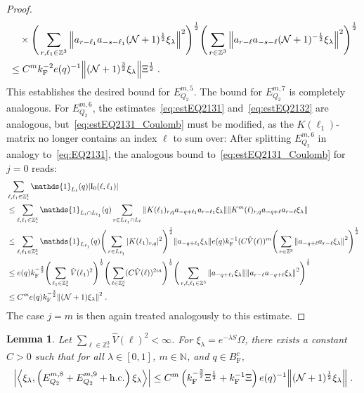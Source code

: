 \documentclass[12pt,a4paper]{article}
\numberwithin{equation}{section}
\newcommand{\NNN}{\mathbb{N}}
\newcommand{\1}{\mathbb{I}}
\newcommand{\F}{\mathrm{F}}
\newcommand{\I}{\mathrm{I}}
\newcommand{\Z}{\mathbb{Z}}
\newcommand{\NN}{\mathcal{N}}
\newcommand{\half}{\frac{1}{2}}
\newcommand{\eva}[1]{\left\langle #1 \right\rangle}
\theoremstyle{plain}
\newtheorem{lemma}[theorem]{Lemma}
\theoremstyle{definition}
\theoremstyle{remark}
\theoremstyle{plain}
\theoremstyle{definition}
\theoremstyle{remark}
\begin{document}
\begin{proof}
\begin{align}
	&\quad \times \Bigg( \sum_{r,\ell_1 \in \Z^3} \norm{a_{r-\ell_1} a_{-s-\ell_1} (\NN+1)^{\half} \xi_\lambda}^2 \Bigg)^{\half}
		\Bigg( \sum_{r \in \Z^3} \norm{a_{r-\ell} a_{-s-\ell} (\NN+1)^{-\half} \xi_\lambda }^2 \Bigg)^{\half} \nonumber\\
	&\leq C^m k_{\F}^{-2} e(q)^{-1}
		\norm{(\NN+1)^{\frac 32} \xi_\lambda} \Xi^{\half} \;. \label{eq:estEQ2132}
\end{align} 
This establishes the desired bound for $ E^{m,5}_{Q_2} $. The bound for $ E^{m,7}_{Q_2} $ is completely analogous. For $ E^{m,6}_{Q_2} $, the estimates~\eqref{eq:estEQ2131} and~\eqref{eq:estEQ2132} are analogous, but~\eqref{eq:estEQ2131_Coulomb} must be modified, as the $ K(\ell_1) $-matrix no longer contains an index $ \ell $ to sum over: After splitting $ E^{m,6}_{Q_2} $ in analogy to~\eqref{eq:EQ2131}, the analogous bound to~\eqref{eq:estEQ2131_Coulomb} for $ j = 0 $ reads:
\begin{align}
	&\sum_{\ell,\ell_1 \in \Z^3_*} \mathds{1}_{L_\ell}(q) |\I_0(\ell, \ell_1)| \nonumber\\
	&\leq \sum_{\ell,\ell_1 \in \Z^3_*} \mathds{1}_{L_\ell \cap L_{\ell_1}}(q) \sum\limits_{r\in L_{\ell_1} \cap L_\ell}
		\norm{ K(\ell_1)_{r,q} a_{-q+\ell_1} a_{r-\ell_1} \xi_\lambda}
		\norm{ K^m(\ell)_{r,q} a_{-q+\ell}a_{r-\ell} \xi_\lambda } \nonumber\\
	&\leq \sum_{\ell,\ell_1 \in \Z^3_*} \mathds{1}_{L_{\ell_1}}(q) 
		\Bigg( \sum_{r\in L_{\ell_1}} |K(\ell_1)_{r,q}|^2 \Bigg)^{\half}
		\norm{  a_{-q+\ell_1} \xi_\lambda}
		e(q) k_{\F}^{-1} (C \hat{V}(\ell))^m 
	\Bigg( \sum_{r\in \Z^3} \norm{a_{-q+\ell}a_{r-\ell} \xi_\lambda }^2 \Bigg)^{\half} \nonumber\\
	&\leq e(q) k_{\F}^{-\frac 32}
		\Bigg( \sum_{\ell_1 \in \Z^3_*} \hat{V}(\ell_1)^2 \Bigg)^{\half}
		\Bigg( \sum_{\ell \in \Z^3_*} (C \hat{V}(\ell))^{2m} \Bigg)^{\half}
		\Bigg( \sum_{r, \ell, \ell_1 \in \Z^3} \norm{ a_{-q+\ell_1} \xi_\lambda}
		\norm{a_{r-\ell} a_{-q+\ell} \xi_\lambda }^2 \Bigg)^{\half} \nonumber\\
	&\leq C^m e(q) k_{\F}^{-\frac 32}
		\norm{(\NN+1) \xi_\lambda }^2
		\;. \label{eq:estEQ2131_Coulomb_bis}
\end{align}
The case $ j = m $ is then again treated analogously to this estimate.
\end{proof}


\begin{lemma} \label{lem:EQ218}
Let $ \sum_{\ell \in \Z^3_*} \hat{V}(\ell)^2 < \infty $. For $\xi_\lambda = e^{-\lambda S} \Omega$, there exists a constant $ C > 0 $ such that for all $ \lambda \in [0,1] $, $ m \in \NNN $, and $ q \in B_{\F}^c $,
\begin{align}
	\abs{\eva{\xi_\lambda,\left(E^{m,8}_{Q_2}+E^{m,9}_{Q_2}+\mathrm{h.c.}\right) \xi_\lambda }}
	\leq C^m \left( k_{\F}^{-\frac 32} \Xi^\half
		+ k_{\F}^{-1} \Xi \right)
		e(q)^{-1} \norm{(\NN+1)^{\half} \xi_\lambda} \;.\label{eq:estEQ218}
\end{align}
\end{lemma}
\end{document}

